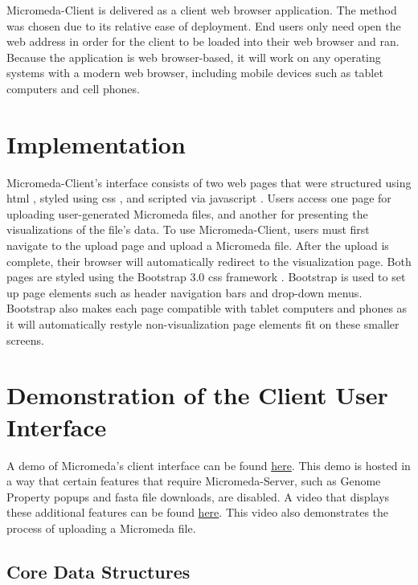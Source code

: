 Micromeda-Client is delivered as a client web browser application. The method 
was chosen due to its relative ease of deployment. End users only need open the 
web address in order for the client to be loaded into their web browser and ran. 
Because the application is web browser-based, it will work on any operating 
systems with a modern web browser, including mobile devices such as tablet 
computers and cell phones.

\section{Implementation} \label{client-implementation}

Micromeda-Client's interface consists of two web pages that were structured 
using \gls{html} \cite{HTML5}, styled using \gls{css} \cite{CSS3}, and scripted 
via \gls{javascript} \cite{flanagan2006javascript}. Users access one page for 
uploading user-generated Micromeda files, and another for presenting the 
visualizations of the file's data. To use Micromeda-Client, users must first 
navigate to the upload page and upload a Micromeda file. After the upload is 
complete, their browser will automatically redirect to the visualization page. 
Both pages are styled using the Bootstrap 3.0 \gls{css} framework 
\cite{spurlock2013bootstrap}. Bootstrap is used to set up page elements such as 
header navigation bars and drop-down menus. Bootstrap also makes each page 
compatible with tablet computers and phones as it will automatically restyle 
non-visualization page elements fit on these smaller screens.

\section{Demonstration of the Client User Interface} \label{client-demo}

A demo of Micromeda’s client interface can be found 
\href{http://tundra-pear.glitch.me}{here}. This demo is hosted in a way that 
certain features that require Micromeda-Server, such as Genome Property popups 
and \gls{fasta} file downloads, are disabled. A video that displays these additional 
features can be found 
\href{http://drive.google.com/file/d/1AhiiyCJcrLv_NqaTXSuxzuaZ8s0aCUtu/view?usp=sharing}{here}. 
This video also demonstrates the process of uploading a Micromeda file.

\subsection{Core Data Structures} \label{visual-data-structures}

